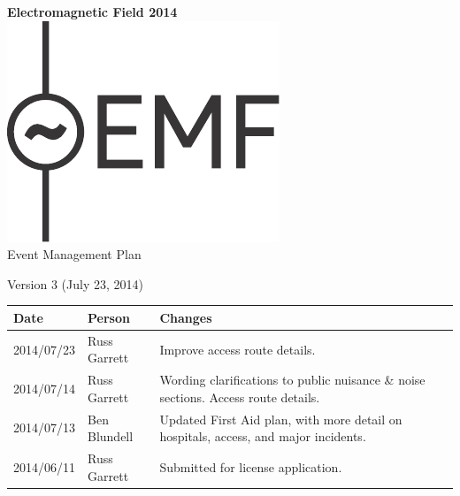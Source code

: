 

\newcommand{\st}{\superscript{st} }
\newcommand{\nd}{\superscript{nd} }
\renewcommand{\th}{\superscript{th} }

\pagestyle{fancy}
\rhead{}
\chead{}
\lhead{}



\begin{titlepage}
\thispagestyle{empty}
\begin{center}
{\bf \LARGE Electromagnetic Field 2014}\\[36pt]
\includegraphics{emf-logo.pdf}\\[48pt]
{\Large Event Management Plan}

Version 3 (July 23, 2014)

\vfill

\begin{tabular}{l | l | p{10cm}}
  Date & Person & Changes \\
  \hline
  2014/07/23 & Russ Garrett & Improve access route details. \\
  2014/07/14 & Russ Garrett & Wording clarifications to public nuisance \& noise sections. Access route details.  \\
  2014/07/13 & Ben Blundell & Updated First Aid plan, with more detail on hospitals, access, and major incidents. \\
  2014/06/11 & Russ Garrett & Submitted for license application. \\
\end{tabular}

\end{center}
\end{titlepage}

\tableofcontents

\newpage



